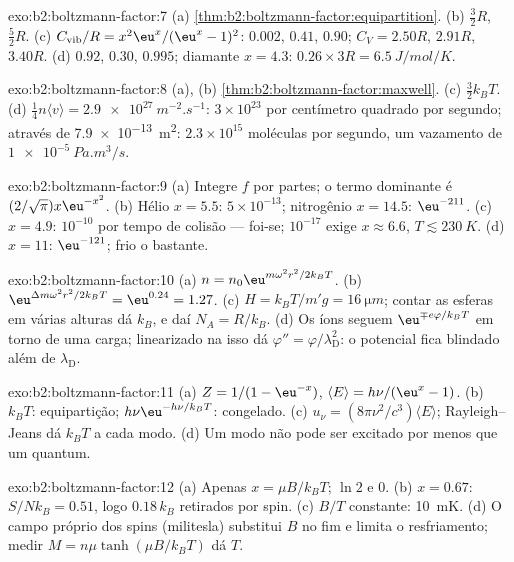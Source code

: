 \begin{solution}{exo:b2:boltzmann-factor:7}
(a) \cref{thm:b2:boltzmann-factor:equipartition}. (b) $\tfrac32R$,
$\tfrac52R$. (c) $C_{\text{vib}}/R = x^2\eu^x/(\eu^x - 1)^2$: $0.002$, $0.41$, $0.90$;
$C_V = 2.50R$, $2.91R$, $3.40R$. (d) $0.92$, $0.30$, $0.995$; diamante $x = 4.3$:
$0.26 \times 3R = \qty{6.5}{J/mol/K}$.
\end{solution}

\begin{solution}{exo:b2:boltzmann-factor:8}
(a), (b) \cref{thm:b2:boltzmann-factor:maxwell}. (c) $\tfrac32k_BT$. (d)
$\tfrac14n\langle v\rangle = \qty{2.9e27}{m^{-2}.s^{-1}}$: $3 \times 10^{23}$ por centímetro
quadrado por segundo; através de \qty{7.9e-13}{m^2}: $2.3 \times 10^{15}$
moléculas por segundo, um vazamento de $\qty{1e-5}{Pa.m^3/s}$.
\end{solution}

\begin{solution}{exo:b2:boltzmann-factor:9}
(a) Integre $f$ por partes; o termo dominante é $(2/\sqrt\pi)x\eu^{-x^2}$. (b)
Hélio $x = 5.5$: $5 \times 10^{-13}$; nitrogênio $x = 14.5$: $\eu^{-211}$. (c) $x =
4.9$: $10^{-10}$ por tempo de colisão --- foi-se; $10^{-17}$ exige $x \approx 6.6$,
$T \lesssim \qty{230}{K}$. (d) $x = 11$: $\eu^{-121}$; frio o bastante.
\end{solution}

\begin{solution}{exo:b2:boltzmann-factor:10}
(a) $n = n_0\eu^{m\omega^2r^2/2k_BT}$. (b) $\eu^{\Delta m\omega^2r^2/2k_BT} = \eu^{0.24} =
1.27$. (c) $H = k_BT/m'g = \qty{16}{\micro m}$; contar as esferas em
várias alturas dá $k_B$, e daí $N_A = R/k_B$. (d) Os íons seguem
$\eu^{\mp e\varphi/k_BT}$ em torno de uma carga; linearizado na 
isso dá $\varphi'' = \varphi/\lambda_{\text{D}}^2$: o potencial fica blindado
além de $\lambda_{\text{D}}$.
\end{solution}

\begin{solution}{exo:b2:boltzmann-factor:11}
(a) $Z = 1/(1 - \eu^{-x})$, $\langle E\rangle = h\nu/(\eu^x - 1)$. (b) $k_BT$:
equipartição; $h\nu\eu^{-h\nu/k_BT}$: congelado. (c) $u_\nu = (8\pi\nu^2/c^3)\langle E
\rangle$; Rayleigh--Jeans dá $k_BT$ a cada modo. (d) Um modo não pode ser
excitado por menos que um quantum.
\end{solution}

\begin{solution}{exo:b2:boltzmann-factor:12}
(a) Apenas $x = \mu B/k_BT$; $\ln 2$ e $0$. (b) $x = 0.67$: $S/Nk_B = 0.51$, logo
$0.18\,k_B$ retirados por spin. (c) $B/T$ constante: \qty{10}{mK}. (d) O campo
próprio dos spins (militesla) substitui $B$ no fim e limita o resfriamento;
medir $M = n\mu\tanh(\mu B/k_BT)$ dá $T$.
\end{solution}


